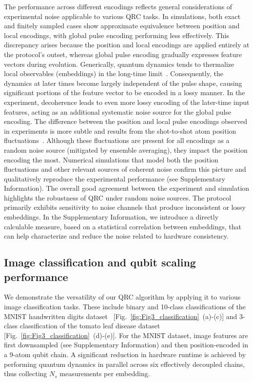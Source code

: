 \documentclass[english,floatfix,twocolumn,showpacs, aps, prx, reprint, superscriptaddress, longbibliography]{revtex4-2}
\begin{document}
The performance across different encodings reflects general considerations of experimental noise applicable to various QRC tasks. In simulations, both exact and finitely sampled cases show approximate equivalence between position and local encodings, with global pulse encoding performing less effectively. This discrepancy arises because the position and local encodings are applied entirely at the protocol's outset, whereas global pulse encoding gradually expresses feature vectors during evolution. Generically, quantum dynamics tends to thermalize local observables (embeddings) in the long-time limit~\cite{Deutsch_2018}. Consequently, the dynamics at later times become largely independent of the pulse shape, causing significant portions of the feature vector to be encoded in a lossy manner. In the experiment, decoherence leads to even more lossy encoding of the later-time input features, acting as an additional systematic noise source for the global pulse encoding. The difference between the position and local pulse encodings observed in experiments is more subtle and results from the shot-to-shot atom position fluctuations~\cite{Wurtz2023}. Although these fluctuations are present for all encodings as a random noise source (mitigated by ensemble averaging), they impact the position encoding the most. Numerical simulations that model both the position fluctuations and other relevant sources of coherent noise confirm this picture and qualitatively reproduce the experimental performance (see Supplementary Information). The overall good agreement between the experiment and simulation highlights the robustness of QRC under random noise sources. The protocol primarily exhibits sensitivity to noise channels that produce inconsistent or lossy embeddings. In the Supplementary Information, we introduce a directly calculable measure, based on a statistical correlation between embeddings, that can help characterize and reduce the noise related to hardware consistency.

\subsection*{Image classification and qubit scaling performance}

We demonstrate the versatility of our QRC algorithm by applying it to various image classification tasks. These include binary and 10-class classifications of the MNIST handwritten digits dataset~\cite{Deng2012} [Fig.~\ref{fig:Fig3_classification}~(a)-(c)] and 3-class classification of the tomato leaf disease dataset~\cite{hughes2016tomato} [Fig.~\ref{fig:Fig3_classification}~(d)-(e)]. For the MNIST dataset, image features are first downsampled (see Supplementary Information) and then position-encoded in a 9-atom qubit chain. A significant reduction in hardware runtime is achieved by performing quantum dynamics in parallel across six effectively decoupled chains, thus collecting $N_s$ measurements per embedding.
\end{document}
